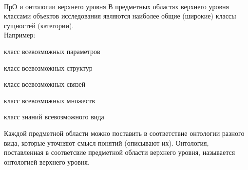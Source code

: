 \begin{frame}{\\ПрО и онтологии верхнего уровня}%
	\vspace{10mm}
	В предметных областях верхнего уровня классами объектов исследования являются наиболее общие (широкие) классы сущностей (категории). \\
	Например:
	\begin{textitemize}
		\item класс всевозможных параметров
		\item класс всевозможных структур
		\item класс всевозможных связей
		\item класс всевозможных множеств
		\item класс знаний всевозможного вида
	\end{textitemize}
	Каждой предметной области можно поставить в соответствие онтологии разного вида, которые уточняют смысл понятий (описывают их). Онтология, поставленная в соответсвие предметной области верхнего уровня, называется онтологией верхнего уровня.
\end{frame}